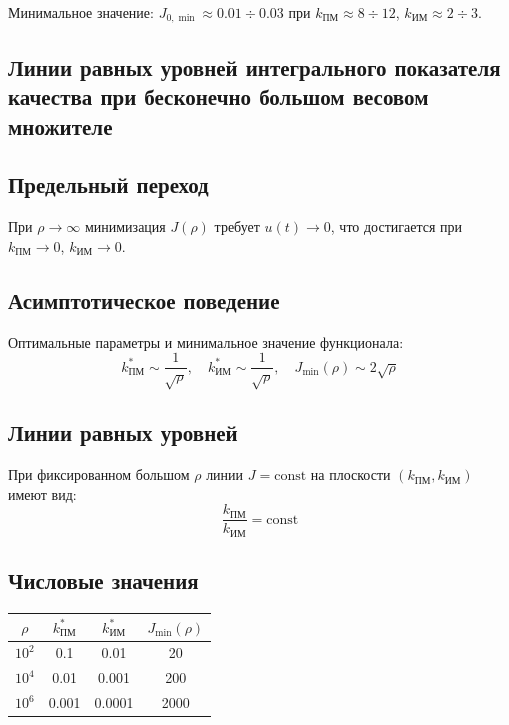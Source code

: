 \documentclass[14pt]{extreport}
\begin{document}
{Минимальное значение: $J_{0,\min} \approx 0.01 \div 0.03$ при $k_{\text{ПМ}} \approx 8 \div 12$, $k_{\text{ИМ}} \approx 2 \div 3$.

        \subsection{Линии равных уровней интегрального показателя качества при бесконечно большом весовом множителе}
        \subsection*{Предельный переход}
При $\rho \to \infty$ минимизация $J(\rho)$ требует $u(t) \to 0$, что достигается при $k_{\text{ПМ}} \to 0$, $k_{\text{ИМ}} \to 0$.

\subsection*{Асимптотическое поведение}
Оптимальные параметры и минимальное значение функционала:
\[
k_{\text{ПМ}}^* \sim \frac{1}{\sqrt{\rho}}, \quad k_{\text{ИМ}}^* \sim \frac{1}{\sqrt{\rho}}, \quad J_{\min}(\rho) \sim 2\sqrt{\rho}
\]

\subsection*{Линии равных уровней}
При фиксированном большом $\rho$ линии $J = \text{const}$ на плоскости $(k_{\text{ПМ}}, k_{\text{ИМ}})$ имеют вид:
\[
\frac{k_{\text{ПМ}}}{k_{\text{ИМ}}} = \text{const}
\]

\begin{center}
\end{center}

\subsection*{Числовые значения}
\begin{table}[h]
\centering
\begin{tabular}{|c|c|c|c|}
\hline
$\rho$ & $k_{\text{ПМ}}^*$ & $k_{\text{ИМ}}^*$ & $J_{\min}(\rho)$ \\
\hline
$10^2$ & 0.1 & 0.01 & 20 \\
$10^4$ & 0.01 & 0.001 & 200 \\
$10^6$ & 0.001 & 0.0001 & 2000 \\
\hline
\end{tabular}
\end{table}

}
\end{document}
